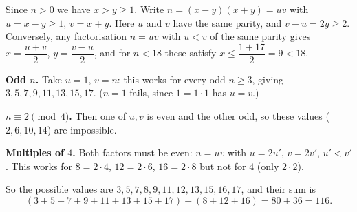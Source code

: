 Since $n>0$ we have $x>y\ge1$. Write $n=(x-y)(x+y)=uv$ with $u=x-y\ge1$, $v=x+y$. Here $u$ and $v$ have the same parity, and $v-u=2y\ge2$. Conversely, any factorisation $n=uv$ with $u<v$ of the same parity gives $x=\dfrac{u+v}{2}$, $y=\dfrac{v-u}{2}$, and for $n<18$ these satisfy $x\le\dfrac{1+17}{2}=9<18$.

\textbf{Odd $n$.} Take $u=1$, $v=n$: this works for every odd $n\ge3$, giving $3,5,7,9,11,13,15,17$. ($n=1$ fails, since $1=1\cdot1$ has $u=v$.)

\textbf{$n\equiv2\pmod4$.} Then one of $u,v$ is even and the other odd, so these values ($2,6,10,14$) are impossible.

\textbf{Multiples of $4$.} Both factors must be even: $n=uv$ with $u=2u'$, $v=2v'$, $u'<v'$. This works for $8=2\cdot4$, $12=2\cdot6$, $16=2\cdot8$ but not for $4$ (only $2\cdot2$).

So the possible values are $3,5,7,8,9,11,12,13,15,16,17$, and their sum is
\[
(3+5+7+9+11+13+15+17)+(8+12+16)=80+36=\boxed{116}.
\]
